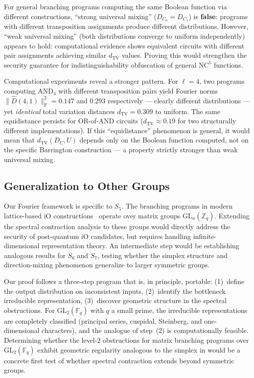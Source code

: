 \documentclass[version=submission]{iacrcc}
\newcommand{\norm}[1]{\lVert #1 \rVert}
\newcommand{\frob}[1]{\norm{#1}_{\mathrm{F}}}
\newcommand{\dtv}{d_{\mathrm{TV}}}
\newcommand{\Dhat}{\widehat{D}}
\begin{document}
For general branching programs computing the same Boolean function via
different constructions, ``strong universal mixing'' ($D_{C_0} = D_{C_1}$)
is \textbf{false}: programs with different transposition assignments produce
different distributions. However, ``weak universal mixing'' (both distributions
converge to uniform independently) appears to hold: computational evidence shows
equivalent circuits with different pair assignments achieving similar $\dtv$
values. Proving this would strengthen the security guarantee for
indistinguishability obfuscation of general $\mathrm{NC}^1$ functions.

Computational experiments reveal a stronger pattern.  For $\ell = 4$, two
programs computing $\mathrm{AND}_4$ with different transposition pairs
yield Fourier norms $\frob{\Dhat(4,1)}^2 = 0.147$ and $0.293$
respectively --- clearly different distributions --- yet \emph{identical}
total variation distances $\dtv = 0.309$ to uniform.  The same equidistance
persists for OR-of-AND circuits ($\dtv \approx 0.19$ for two structurally
different implementations).  If this ``equidistance'' phenomenon is general,
it would mean that $\dtv(D_C, U)$ depends only on the Boolean function
computed, not on the specific Barrington construction --- a property
strictly stronger than weak universal mixing.


\subsection{Generalization to Other Groups}

Our Fourier framework is specific to $S_5$. The branching programs in modern
lattice-based iO constructions~\cite{BDGM20,WW21,HJL25} operate over matrix
groups $\mathrm{GL}_n(\mathbb{Z}_q)$. Extending the spectral contraction
analysis to these groups would directly address the security of post-quantum
iO candidates, but requires handling infinite-dimensional representation
theory. An intermediate step would be establishing analogous results for
$S_6$ and $S_7$, testing whether the simplex structure and direction-mixing
phenomenon generalize to larger symmetric groups.

Our proof follows a three-step program that is, in principle, portable:
(1)~define the output distribution on inconsistent inputs,
(2)~identify the bottleneck irreducible representation,
(3)~discover geometric structure in the spectral obstructions.
For $\mathrm{GL}_2(\mathbb{F}_q)$ with $q$ a small prime, the irreducible
representations are completely classified (principal series, cuspidal,
Steinberg, and one-dimensional characters), and the analogue of step~(2) is
computationally feasible.  Determining whether the level-$2$ obstructions
for matrix branching programs over $\mathrm{GL}_2(\mathbb{F}_q)$ exhibit
geometric regularity analogous to the simplex in  would
be a concrete first test of whether spectral contraction extends beyond
symmetric groups.
\end{document}
